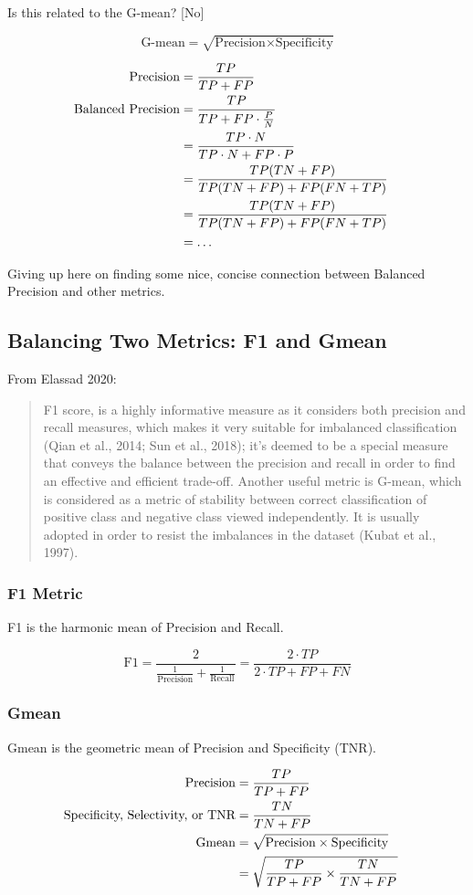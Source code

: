 Is this related to the G-mean?  [No]

$$\text{G-mean} = \sqrt{\text{Precision} \times \text{Specificity}}$$

\begin{align*}
	\text{Precision} &= \frac{TP}{TP+FP} \cr
	\text{Balanced Precision} &= \frac{TP}{TP+FP \cdot \frac{P}{N}} \cr
		&= \frac{TP \cdot N}{TP \cdot N + FP \cdot P} \cr
		&= \frac{TP (TN+FP)}{TP(TN+FP) + FP (FN+TP)} \cr
		&= \frac{TP (TN+FP)}{TP(TN+FP) + FP (FN+TP)} \cr
		&= \dots \cr
\end{align*}

Giving up here on finding some nice, concise connection between Balanced Precision and other metrics.  


\subsection{Balancing Two Metrics:  F1 and Gmean}

From Elassad 2020:
\cite{ELAMRANIABOUELASSAD2020102708}

\begin{quote}
F1 score, is a highly informative measure as it considers both precision and recall measures, which makes it very suitable for
imbalanced classification (Qian et al., 2014; Sun et al., 2018); it’s deemed to be a special measure that conveys the balance between
the precision and recall in order to find an effective and efficient trade-off. Another useful metric is G-mean, which is considered as a
metric of stability between correct classification of positive class and negative class viewed independently. It is usually adopted in
order to resist the imbalances in the dataset (Kubat et al., 1997).
\end{quote}


\subsubsection{F1 Metric}

F1 is the harmonic mean of Precision and Recall.  

$$\text{F1} = \frac{2}{\frac{1}{\text{Precision}} + \frac{1}{\text{Recall}}} 
	= \frac{2 \cdot TP}{2\cdot TP + FP + FN}$$

\subsubsection{Gmean}

Gmean is the geometric mean of Precision and Specificity (TNR).

\begin{align*}
	\text{Precision} & = \frac{TP}{TP + FP}\cr
	\text{Specificity, Selectivity, or TNR} &= \frac{TN}{TN + FP} \cr
	\text{Gmean} &= \sqrt{ \text{Precision} \times \text{Specificity}} \cr
	&= \sqrt{
		\frac{TP}{TP+FP} \times \frac{TN}{TN+FP}
		}
\end{align*}





